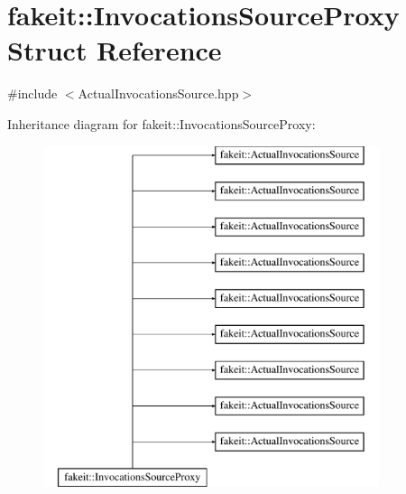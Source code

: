 \hypertarget{structfakeit_1_1InvocationsSourceProxy}{}\section{fakeit\+::Invocations\+Source\+Proxy Struct Reference}
\label{structfakeit_1_1InvocationsSourceProxy}


{\ttfamily \#include $<$Actual\+Invocations\+Source.\+hpp$>$}

Inheritance diagram for fakeit\+::Invocations\+Source\+Proxy\+:\begin{figure}[H]
\begin{center}
\leavevmode
\includegraphics[height=10.000000cm]{structfakeit_1_1InvocationsSourceProxy}
\end{center}
\end{figure}
